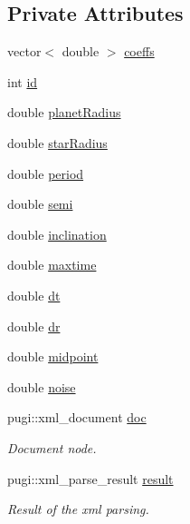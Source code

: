\subsection*{Private Attributes}
\begin{DoxyCompactItemize}
\item 
vector$<$ double $>$ \hyperlink{classConfig_1_1Config_a9c679f504309dbeb9f0888f40df2c36b}{coeffs}
\item 
int \hyperlink{classConfig_1_1Config_ae54078b2b14014b3b1bba13fc9aa2fa9}{id}
\item 
double \hyperlink{classConfig_1_1Config_aa7f8b446e7c7db6ab117de7bb12e8193}{planetRadius}
\item 
double \hyperlink{classConfig_1_1Config_a2420c3fc48cec4f14644afb532ffcf39}{starRadius}
\item 
double \hyperlink{classConfig_1_1Config_afc6907d04c9ccbf1479845699943c3bc}{period}
\item 
double \hyperlink{classConfig_1_1Config_ac226b3dfdaf293240a6bfceb3b195d88}{semi}
\item 
double \hyperlink{classConfig_1_1Config_adb71ce5d055b439fa0c3641c6400327e}{inclination}
\item 
double \hyperlink{classConfig_1_1Config_a3dcb214d120167f7bb6902892942d831}{maxtime}
\item 
double \hyperlink{classConfig_1_1Config_a37c6fb687d364836452dc746be9bc0cb}{dt}
\item 
double \hyperlink{classConfig_1_1Config_ab116322f18f71b98be1ab00413edc400}{dr}
\item 
double \hyperlink{classConfig_1_1Config_ada14b015b08c65e217d223fead656748}{midpoint}
\item 
double \hyperlink{classConfig_1_1Config_a0e9e59c906c710bb12efe8a620502109}{noise}
\item 
pugi::xml\_\-document \hyperlink{classConfig_1_1Config_a61dfb08aaa9e051084d7c94cbe2d23b5}{doc}
\begin{DoxyCompactList}\small\item\em Document node. \item\end{DoxyCompactList}\item 
pugi::xml\_\-parse\_\-result \hyperlink{classConfig_1_1Config_adc7aa2f037d2b6c7f377b2ac2ec0e1b1}{result}
\begin{DoxyCompactList}\small\item\em Result of the xml parsing. \item\end{DoxyCompactList}\item 

\end{DoxyCompactItemize}
